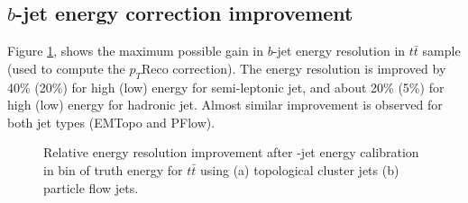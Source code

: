 \subsection{$b$-jet energy correction improvement}
\label{Jet:Cal:BCal:Result}
Figure \ref{fig:Jet:Cal:BCal:Result:E}, shows the maximum possible gain in $b$-jet energy resolution in $t\bar{t}$ sample (used to compute the $p_{T}$Reco correction). The energy resolution is improved by 40\% (20\%) for high (low) energy for semi-leptonic jet, and about 20\% (5\%) for high (low) energy for hadronic jet. Almost similar improvement is observed for both jet types (EMTopo and PFlow).
\begin{figure}[ht]
   \centering
   \quad
   \caption{Relative energy resolution improvement after \bq-jet energy calibration in bin of truth energy for $t\bar{t}$ using (a) topological cluster jets (b) particle flow jets.}
   \label{fig:Jet:Cal:BCal:Result:E}
\end{figure}

